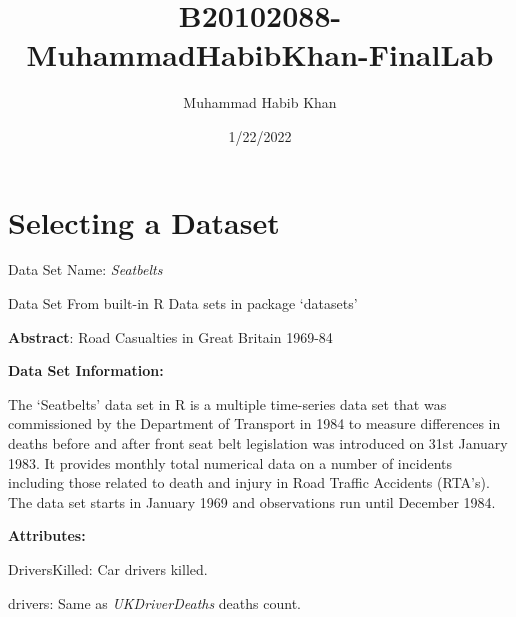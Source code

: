 \documentclass[
]{article}
\title{B20102088-MuhammadHabibKhan-FinalLab}
\author{Muhammad Habib Khan}
\date{1/22/2022}
\newenvironment{Shaded}{\begin{snugshade}}{\end{snugshade}}
\newcommand{\AttributeTok}[1]{\textcolor[rgb]{0.77,0.63,0.00}{#1}}
\newcommand{\CommentTok}[1]{\textcolor[rgb]{0.56,0.35,0.01}{\textit{#1}}}
\newcommand{\ConstantTok}[1]{\textcolor[rgb]{0.00,0.00,0.00}{#1}}
\newcommand{\FunctionTok}[1]{\textcolor[rgb]{0.00,0.00,0.00}{#1}}
\newcommand{\NormalTok}[1]{#1}
\newcommand{\OtherTok}[1]{\textcolor[rgb]{0.56,0.35,0.01}{#1}}
\newcommand{\SpecialCharTok}[1]{\textcolor[rgb]{0.00,0.00,0.00}{#1}}
\begin{document}
\maketitle

{
\setcounter{tocdepth}{2}
\tableofcontents
}
\begin{Shaded}
\end{Shaded}

\hypertarget{selecting-a-dataset}{%
\section{Selecting a Dataset}\label{selecting-a-dataset}}

Data Set Name: \emph{Seatbelts}

Data Set From built-in R Data sets in package `datasets'

\textbf{Abstract}: Road Casualties in Great Britain 1969-84

\textbf{Data Set Information:}

The `Seatbelts' data set in R is a multiple time-series data set that
was commissioned by the Department of Transport in 1984 to measure
differences in deaths before and after front seat belt legislation was
introduced on 31st January 1983. It provides monthly total numerical
data on a number of incidents including those related to death and
injury in Road Traffic Accidents (RTA's). The data set starts in January
1969 and observations run until December 1984.

\textbf{Attributes:}

DriversKilled: Car drivers killed.

drivers: Same as \emph{UKDriverDeaths} deaths count.
\end{document}

